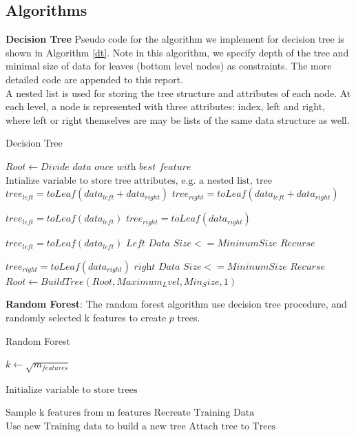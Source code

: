 \documentclass[11pt]{article}
\begin{document}
\subsection{Algorithms}
\textbf{Decision Tree} Pseudo code for the algorithm we implement for decision tree is shown in Algorithm \ref{dt}. 
Note in this algorithm, we specify depth of the tree and minimal size of data for leaves (bottom level nodes) as constraints. The more detailed code are appended to this report. \\

A nested list is used for storing the tree structure and attributes of each node. At each level, a node is represented with three attributes: index, left and right, where left or right themselves are may be lists of the same data structure as well.\\


\begin{algorithm}[H]
	\caption{Decision Tree}\label{dt}
	\begin{algorithmic}[1]
		\State $Root \gets \textit{Divide data once with best feature}$
		\State $\text{Intialize variable to store tree attributes, e.g. a nested list, tree}$
		\State $tree_{left} = toLeaf(data_{left} + data_{right} )$  
		\State $tree_{right} = toLeaf(data_{left} + data_{right} )$  \Return
		\EndIf
		
		\State $tree_{left} = toLeaf(data_{left})$  
		\State $tree_{right} = toLeaf(data_{right})$
		\Return
		\EndIf
		
		\State $tree_{left} = toLeaf(data_{left})$  
		\Else 
		\State $\textit{Left Data Size} <= Mininum Size$
		\State $\textit{Recurse}$
		\EndIf
		
		\State $tree_{right} = toLeaf(data_{right})$  
		\Else 
		\State $\textit{right Data Size} <= Mininum Size$
		\State $\textit{Recurse}$
		\EndIf
		\EndProcedure
		\State $Root \gets Build Tree(Root, Maximum_Lvel, Min_Size, 1)$
	\end{algorithmic}
\end{algorithm}

\textbf{Random Forest}: The random forest algorithm use decision tree procedure, and randomly selected k features to create $p$ trees. 


\begin{algorithm}[H]
	\caption{Random Forest}\label{rf}
	\begin{algorithmic}[2]
		\State $k \gets \sqrt{m_{features}}$
		
		\State $\text{Initialize variable to store trees}$
		
		
		\State $\text{Sample k features from m features}$ 
		\State $\text{Recreate Training Data}$ 
		\State $\text{Use new Training data to build a new tree}$
		\State $\text{Attach tree to Trees}$
		\EndFor
		
		\EndProcedure
	\end{algorithmic}
\end{algorithm}
\end{document}
